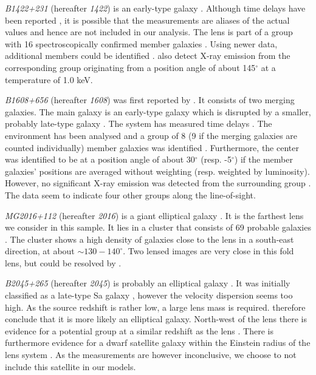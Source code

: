 \documentclass[useAMS,usenatbib]{mn2e}
\begin{document}
\textit{B1422+231} (hereafter \textit{1422}) is an early-type galaxy \citep{1992MNRAS.259P...1P,1994AJ....107...28Y}. Although time delays have been reported \citep{2001MNRAS.326.1403P}, it is possible that the measurements are aliases of the actual values \citep{2003AJ....126...29R} and hence are not included in our analysis. The lens is part of a group with 16 spectroscopically confirmed member galaxies \citep{2006ApJ...641..169M}. Using newer data, additional members could be identified \citep{2011ApJ...726...84W}. \citet{2004ApJ...610..686G} also detect X-ray emission from the corresponding group originating from a position angle of about 145$^{\circ}$ at a temperature of 1.0 keV.

\textit{B1608+656} (hereafter \textit{1608}) was first reported by \citet{1995ApJ...447L...5M}. It consists of two merging galaxies. The main galaxy is an early-type galaxy which is disrupted by a smaller, probably late-type galaxy \citep{2003ApJ...584..100S}. The system has measured time delays \citep{2002ApJ...581..823F}. The environment has been analysed and a group of 8 (9 if the merging galaxies are counted individually) member galaxies was identified \citep{2006ApJ...642...30F}. Furthermore, the center was identified to be at a position angle of about 30$^{\circ}$ (resp. -5$^{\circ}$) if the member galaxies' positions are averaged without weighting (resp. weighted by luminosity). However, no significant X-ray emission was detected from the surrounding group \citep{2005ApJ...625..633D}. The data seem to indicate four other groups along the line-of-sight.

\textit{MG2016+112} (hereafter \textit{2016}) is a giant elliptical galaxy \citep{1984Sci...223...46L,1986AJ.....91..991S}. It is the farthest lens we consider in this sample. It lies in a cluster that consists of 69 probable galaxies \citep{2003MNRAS.344..337T}. The cluster shows a high density of galaxies close to the lens in a south-east direction, at about $\sim130-140^{\circ}$. Two lensed images are very close in this fold lens, but could be resolved by \citet{2009MNRAS.394..174M}.

\textit{B2045+265} (hereafter \textit{2045}) is probably an elliptical galaxy \citep{2007MNRAS.378..109M}. It was initially classified as a late-type Sa galaxy \citep{1999AJ....117..658F}, however the velocity dispersion seems too high. As the source redshift is rather low, a large lens mass is required. \citet{2007MNRAS.378..109M} therefore conclude that it is more likely an elliptical galaxy. North-west of the lens there is evidence for a potential group at a similar redshift as the lens \citep{1999AJ....117..658F}. There is furthermore evidence for a dwarf satellite galaxy within the Einstein radius of the lens system \citep{2007MNRAS.378..109M}. As the measurements are however inconclusive, we choose to not include this satellite in our models.
\end{document}
